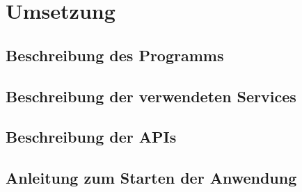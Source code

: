 \chapter{Umsetzung}
\label{sec:chapter4}

\section{Beschreibung des Programms}
\label{sec:4-1}

\section{Beschreibung der verwendeten Services}
\label{sec:4-2}

\section{Beschreibung der APIs}
\label{sec:4-3}

\section{Anleitung zum Starten der Anwendung}
\label{sec:4-4}